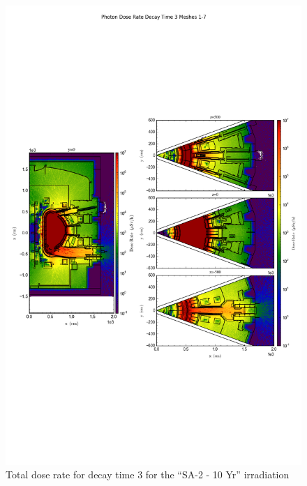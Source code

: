 \documentclass[12pt]{article}
\begin{document}
\begin{figure}[ht!]
\centering
\includegraphics[trim={0cm 8cm, 0cm 8cm},clip,scale=0.75]{../plots/final_model_with_b4c/5year/Photon_Dose_Rate_Decay_Time_3_Meshes_1-7.png}
\caption{Total dose rate for decay time 3 for the ``SA-2 - 10 Yr'' irradiation}
\label{fig:photons_5y_dc3_b4c_dose}
\end{figure}
\end{document}
